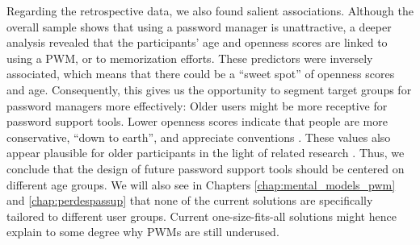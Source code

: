 Regarding the retrospective data, we also found salient associations. Although the overall sample shows that using a password manager is unattractive, a deeper analysis revealed that the participants' age and openness scores are linked to using a \gls{PWM}, or to memorization efforts. These predictors were inversely associated, which means that there could be a ``sweet spot'' of openness scores and age. Consequently, this gives us the opportunity to segment target groups for password managers more effectively: Older users might be more receptive for password support tools. Lower openness scores indicate that people are more conservative, ``down to earth'', and appreciate conventions \cite{McCrae1987ValidationFFM}. These values also appear plausible for older participants in the light of related research \cite{Srivastava2003PersonalityAdulthood}. Thus, we conclude that the design of future password support tools should be centered on different age groups. We will also see in Chapters \ref{chap:mental_models_pwm} and \ref{chap:perdespassup} that none of the current solutions are specifically tailored to different user groups. Current one-size-fits-all solutions might hence explain to some degree why \glspl{PWM} are still underused.



